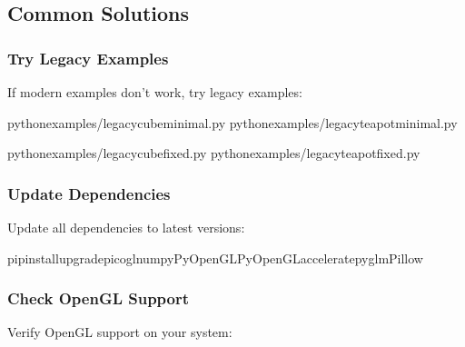 \documentclass[a4paper,10pt,english,openany,oneside]{sphinxmanual}
\begin{document}
\subsection{Common Solutions}
\label{\detokenize{troubleshooting:common-solutions}}

\subsubsection{Try Legacy Examples}
\label{\detokenize{troubleshooting:try-legacy-examples}}
\sphinxAtStartPar
If modern examples don’t work, try legacy examples:

\begin{sphinxVerbatim}[commandchars=\\\{\}]
pythonexamples/legacy\PYGZus{}cube\PYGZus{}minimal.py
pythonexamples/legacy\PYGZus{}teapot\PYGZus{}minimal.py

pythonexamples/legacy\PYGZus{}cube\PYGZus{}fixed.py
pythonexamples/legacy\PYGZus{}teapot\PYGZus{}fixed.py
\end{sphinxVerbatim}


\subsubsection{Update Dependencies}
\label{\detokenize{troubleshooting:update-dependencies}}
\sphinxAtStartPar
Update all dependencies to latest versions:

\begin{sphinxVerbatim}[commandchars=\\\{\}]
pipinstall\PYGZhy{}\PYGZhy{}upgradepicoglnumpyPyOpenGLPyOpenGL\PYGZhy{}acceleratepyglmPillow
\end{sphinxVerbatim}


\subsubsection{Check OpenGL Support}
\label{\detokenize{troubleshooting:check-opengl-support}}
\sphinxAtStartPar
Verify OpenGL support on your system:
\end{document}
